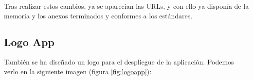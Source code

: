 Tras realizar estos cambios, ya se aparecían las URLs, y con ello ya disponía de la memoria y los anexos terminados y conformes a los estándares.

\subsection{Logo App}

También se ha diseñado un logo para el despliegue de la aplicación. Podemos verlo en la siguiente imagen (figura \ref{fig:logoapp}):
